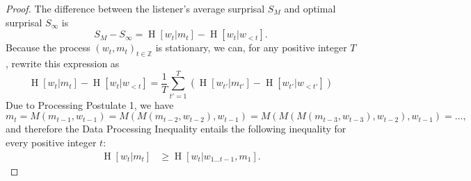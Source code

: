 \documentclass[11pt,letterpaper]{article}
\newcommand\mhahn[1]{{\color{red}(#1)}}
\newcounter{theorem}
\newtheorem{lemma}[theorem]{Lemma}
\begin{document}
\begin{proof}


The difference between the listener's average surprisal $S_M$ and optimal surprisal $S_\infty$ is 
	\begin{equation}
	\label{eq:surprisal-divergence}
		S_M - S_\infty = \operatorname{H}[w_t | m_t] - \operatorname{H}[w_t | w_{<t}].
	\end{equation}
	Because the process $(w_t, m_t)_{t\in\mathbb{Z}}$ is stationary, we can, for any positive integer $T$, rewrite this expression as
\begin{equation}\label{eq:byStation}
\operatorname{H}[w_t | m_t] - \operatorname{H}[w_t | w_{<t}] =  \frac{1}{T} \sum_{t'=1}^{T} \left(\operatorname{H}[w_{t'} | m_{t'}] - \operatorname{H}[w_{t'} | w_{<t'}]\right) 
\end{equation}
%
%
%
Due to Processing Postulate 1, we have %
\begin{equation}
	m_t = M(m_{t-1}, w_{t-1}) = M(M(m_{t-2}, w_{t-2}), w_{t-1}) = M(M(M(m_{t-3}, w_{t-3}), w_{t-2}), w_{t-1}) = \dots,
\end{equation}
and therefore the Data Processing Inequality \citep{cover2006elements} entails the following inequality for every positive integer $t$:
\begin{align}\label{eq:plugged}
\operatorname{H}[w_t | m_t]& \geq \operatorname{H}[w_t|w_{1\dots t-1}, m_1]. 
\end{align}

\end{proof}
\end{document}
